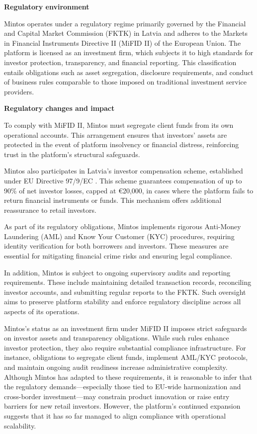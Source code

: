 \documentclass[pdflatex,sn-apa]{sn-jnl}%
\theoremstyle{thmstyleone}%
\theoremstyle{thmstyletwo}%
\theoremstyle{thmstylethree}%
\begin{document}
\textbf{Regulatory environment}

Mintos operates under a regulatory regime primarily governed by the Financial and Capital Market Commission (FKTK) in Latvia and adheres to the Markets in Financial Instruments Directive II (MiFID II) \citep{european_securities_and_markets_authority_mifid_2014} of the European Union. The platform is licensed as an investment firm, which subjects it to high standards for investor protection, transparency, and financial reporting. This classification entails obligations such as asset segregation, disclosure requirements, and conduct of business rules comparable to those imposed on traditional investment service providers.

\textbf{Regulatory changes and impact}

To comply with MiFID II, Mintos must segregate client funds from its own operational accounts. This arrangement ensures that investors’ assets are protected in the event of platform insolvency or financial distress, reinforcing trust in the platform’s structural safeguards.

Mintos also participates in Latvia’s investor compensation scheme, established under EU Directive 97/9/EC \citep{official_journal_l_084_directive_1997}. This scheme guarantees compensation of up to 90\% of net investor losses, capped at €20,000, in cases where the platform fails to return financial instruments or funds. This mechanism offers additional reassurance to retail investors.

As part of its regulatory obligations, Mintos implements rigorous Anti-Money Laundering (AML) and Know Your Customer (KYC) procedures, requiring identity verification for both borrowers and investors. These measures are essential for mitigating financial crime risks and ensuring legal compliance.

In addition, Mintos is subject to ongoing supervisory audits and reporting requirements. These include maintaining detailed transaction records, reconciling investor accounts, and submitting regular reports to the FKTK. Such oversight aims to preserve platform stability and enforce regulatory discipline across all aspects of its operations.

Mintos's status as an investment firm under MiFID II imposes strict safeguards on investor assets and transparency obligations. While such rules enhance investor protection, they also require substantial compliance infrastructure. For instance, obligations to segregate client funds, implement AML/KYC protocols, and maintain ongoing audit readiness increase administrative complexity. Although Mintos has adapted to these requirements, it is reasonable to infer that the regulatory demands—especially those tied to EU-wide harmonization and cross-border investment—may constrain product innovation or raise entry barriers for new retail investors. However, the platform’s continued expansion suggests that it has so far managed to align compliance with operational scalability.
\end{document}
